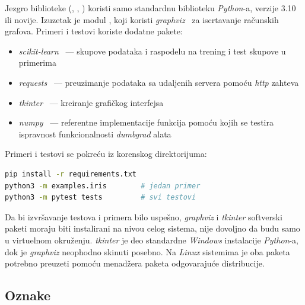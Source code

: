 \documentclass[11pt,a4paper]{article}
\newcommand{\code}[1]{\texttt{\detokenize{#1}}}
\begin{document}
Jezgro biblioteke (\code{engine}, \code{nn}, \code{utils}) koristi samo
standardnu biblioteku \textit{Python}-a, verzije 3.10 ili novije.
Izuzetak je modul \code{graph}, koji koristi \textit{graphviz}~\cite{graphviz}
za iscrtavanje računskih grafova. Primeri i testovi koriste dodatne pakete:
\begin{itemize}
  \item \textit{scikit-learn}~\cite{scikit-learn} ---
        skupove podataka i raspodelu na trening i test skupove u primerima
  \item \textit{requests}~\cite{requests} ---
        preuzimanje podataka sa udaljenih servera pomoću \textit{http} zahteva
  \item \textit{tkinter}~\cite{tkinter} ---
        kreiranje grafičkog interfejsa
  \item \textit{numpy}~\cite{numpy}
        --- referentne implementacije funkcija pomoću kojih
        se testira ispravnost funkcionalnosti \textit{dumbgrad} alata
\end{itemize}
Primeri i testovi se pokreću iz korenskog direktorijuma:

\begin{lstlisting}[language=bash]
pip install -r requirements.txt
python3 -m examples.iris        # jedan primer
python3 -m pytest tests         # svi testovi
\end{lstlisting}

Da bi izvršavanje testova i primera bilo uspešno, \textit{graphviz} i
\textit{tkinter} softverski paketi moraju biti instalirani na nivou celog
sistema, nije dovoljno da budu samo u virtuelnom okruženju. \textit{tkinter}
je deo standardne \textit{Windows} instalacije \textit{Python}-a, dok je
\textit{graphviz} neophodno skinuti posebno. Na \textit{Linux} sistemima je
oba paketa potrebno preuzeti pomoću menadžera paketa odgovarajuće distribucije.

\subsection{Oznake}
\end{document}
